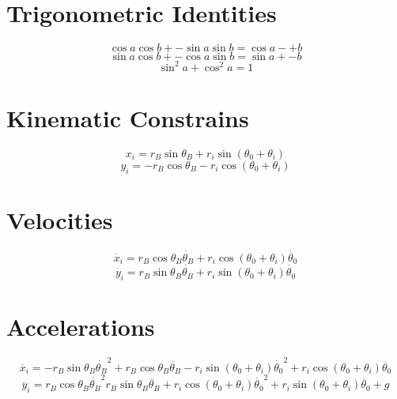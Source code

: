 \documentclass[titlepage]{article}
\numberwithin{equation}{section}
\begin{document}
\section{Trigonometric Identities}
\begin{equation} \label{eq:ti_coscos_sinsin}
\cos a \cos b +- \sin a \sin b = \cos{a -+ b}
\end{equation}
\begin{equation} \label{eq:ti_sincos_cossin}
\sin a \cos b +- \cos a \sin b = \sin{a +- b}
\end{equation}
\begin{equation} \label{eq:ti_sin2_cos2}
\sin^2 a + \cos^2 a = 1
\end{equation}

\section{Kinematic Constrains}
\begin{equation} \label{eq:x_i}
x_i = r_B \sin \theta_B + r_i \sin{(\theta_0 + \theta_i)}
\end{equation}
\begin{equation} \label{eq:y_i}
y_i = -r_B \cos \theta_B - r_i \cos{(\theta_0 + \theta_i)}
\end{equation}

\section{Velocities}
\begin{equation} \label{eq:x_i_dot}
\dot{x_i} = r_B \cos \theta_B \dot{\theta_B} + r_i \cos{(\theta_0 + \theta_i)} \dot{\theta_0}
\end{equation}
\begin{equation} \label{eq:y_i_dot}
\dot{y_i} = r_B \sin \theta_B \dot{\theta_B} + r_i \sin{(\theta_0 + \theta_i)} \dot{\theta_0}
\end{equation}

\section{Accelerations}
\begin{equation} \label{eq:x_i_ddot}
\ddot{x_i} =
    - r_B \sin \theta_B \dot{\theta_B}^2
    + r_B \cos \theta_B \ddot{\theta_B}
    - r_i \sin{(\theta_0 + \theta_i)} \dot{\theta_0}^2
    + r_i \cos{(\theta_0 + \theta_i)} \ddot{\theta_0}
\end{equation}
\begin{equation} \label{eq:y_i_ddot}
\ddot{y_i} = 
    r_B \cos \theta_B \dot{\theta_B}^2
    r_B \sin \theta_B \ddot{\theta_B}
    + r_i \cos{(\theta_0 + \theta_i)} \dot{\theta_0}^2
    + r_i \sin{(\theta_0 + \theta_i)} \ddot{\theta_0}
    + g
\end{equation}
\end{document}
